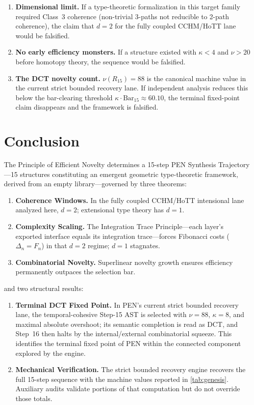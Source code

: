 \documentclass[11pt,a4paper]{article}
\theoremstyle{plain}
\theoremstyle{definition}
\theoremstyle{remark}
\begin{document}
\begin{enumerate}[nosep]
    \item \textbf{Dimensional limit.}
    If a type-theoretic formalization in this target family required Class~3 coherence (non-trivial 3-paths not reducible to 2-path coherence), the claim that $d = 2$ for the fully coupled CCHM/HoTT lane would be falsified.
    \item \textbf{No early efficiency monsters.}
    If a structure existed with $\kappa < 4$ and $\nu > 20$ before homotopy theory, the sequence would be falsified.
    \item \textbf{The DCT novelty count.}
    $\nu(R_{15}) = 88$ is the canonical machine value in the current strict bounded recovery lane.
    If independent analysis reduces this below the bar-clearing threshold $\kappa \cdot \mathrm{Bar}_{15} \approx 60.10$, the terminal fixed-point claim disappears and the framework is falsified.
\end{enumerate}

\section{Conclusion}
\label{sec:conclusion}

The Principle of Efficient Novelty determines a 15-step PEN Synthesis Trajectory---15 structures constituting an emergent geometric type-theoretic framework, derived from an empty library---governed by three theorems:
\begin{enumerate}[nosep]
    \item \textbf{Coherence Windows.} In the fully coupled CCHM/HoTT intensional lane analyzed here, $d = 2$; extensional type theory has $d = 1$.
    \item \textbf{Complexity Scaling.} The Integration Trace Principle---each layer's exported interface equals its integration trace---forces Fibonacci costs ($\Delta_n = F_n$) in that $d = 2$ regime; $d = 1$ stagnates.
    \item \textbf{Combinatorial Novelty.} Superlinear novelty growth ensures efficiency permanently outpaces the selection bar.
\end{enumerate}
and two structural results:
\begin{enumerate}[nosep, start=4]
    \item \textbf{Terminal DCT Fixed Point.} In PEN's current strict bounded recovery lane, the temporal-cohesive Step-15 AST is selected with $\nu=88$, $\kappa=8$, and maximal absolute overshoot; its semantic completion is read as DCT, and Step~16 then halts by the internal/external combinatorial squeeze.
    This identifies the terminal fixed point of PEN within the connected component explored by the engine.
    \item \textbf{Mechanical Verification.} The strict bounded recovery engine recovers the full 15-step sequence with the machine values reported in \cref{tab:genesis}. Auxiliary audits validate portions of that computation but do not override those totals.
\end{enumerate}
\end{document}

